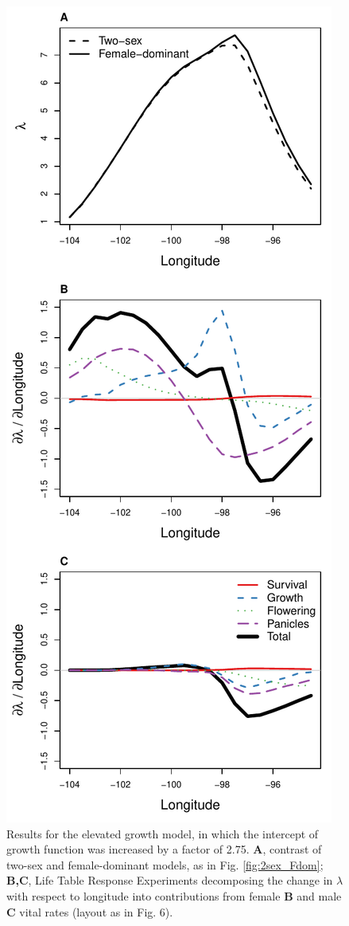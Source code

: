 \documentclass[11pt]{article}
\begin{document}
\begin{figure}[H]
	\begin{center}
		\includegraphics[width=0.5\linewidth]{Figures/elevated_growth_model}
		\caption{Results for the elevated growth model, in which the intercept of growth function was increased by a factor of 2.75.
			\textbf{A}, contrast of two-sex and female-dominant models, as in Fig. \ref{fig:2sex_Fdom};
			\textbf{B,C}, Life Table Response Experiments decomposing the change in $\lambda$ with respect to longitude into contributions from female \textbf{B} and male \textbf{C} vital rates (layout as in Fig. 6). 
		}
		\label{fig:elevated_growth_model}
	\end{center}
\end{figure}

\newpage


\end{document}
